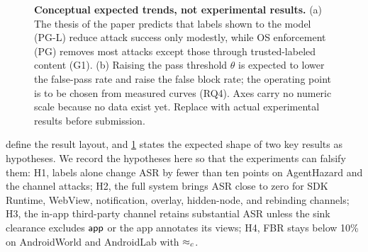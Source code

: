 \begin{table}[t]
\centering
\caption{RQ6: benign utility and overhead per agent. \textbf{Placeholder / expected trend only; replace with actual experimental results before submission.} All cells are intentionally empty.}
\label{tab:res-utility}
\footnotesize
\setlength{\tabcolsep}{3.5pt}
\end{table}

\begin{figure}[t]
  \centering
  
  \caption{\textbf{Conceptual expected trends, not experimental results.} (a) The thesis of the paper predicts that labels shown to the model (PG-L) reduce attack success only modestly, while OS enforcement (PG) removes most attacks except those through trusted-labeled content (G1). (b) Raising the pass threshold $\theta$ is expected to lower the false-pass rate and raise the false block rate; the operating point is to be chosen from measured curves (RQ4). Axes carry no numeric scale because no data exist yet. Replace with actual experimental results before submission.}
  \label{fig:conceptual}
\end{figure}

 define the result layout, and \cref{fig:conceptual} states the expected shape of two key results as hypotheses. We record the hypotheses here so that the experiments can falsify them: H1, labels alone change ASR by fewer than ten points on AgentHazard and the channel attacks; H2, the full system brings ASR close to zero for SDK Runtime, WebView, notification, overlay, hidden-node, and rebinding channels; H3, the in-app third-party channel retains substantial ASR unless the sink clearance excludes $\textsf{app}$ or the app annotates its views; H4, FBR stays below 10\% on AndroidWorld and AndroidLab with $\approx_c$.

